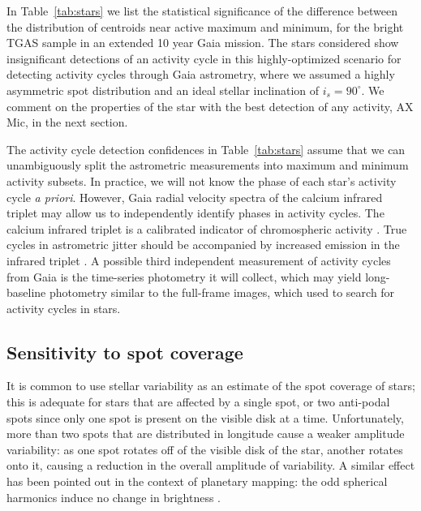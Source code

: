 In Table~\ref{tab:stars} we list the statistical significance of the difference between the distribution of centroids near active maximum and minimum, for the bright TGAS sample in an extended 10 year Gaia mission. The stars considered show insignificant detections of an activity cycle in this highly-optimized scenario for detecting activity cycles through Gaia astrometry, where we assumed a highly asymmetric spot distribution and an ideal stellar inclination of $i_s = 90^\circ$. We comment on the properties of the star with the best detection of any activity, AX Mic, in the next section.

The activity cycle detection confidences in Table~\ref{tab:stars} assume that we can unambiguously split the astrometric measurements into maximum and minimum activity subsets. In practice, we will not know the phase of each star's activity cycle \textit{a priori}. However, Gaia radial velocity spectra of the calcium infrared triplet may allow us to independently identify phases in activity cycles. The calcium infrared triplet is a calibrated indicator of chromospheric activity \citep[see e.g.:][]{Chmielewski2000, Cenarro2001, Cauzzi2008, Zerjal2013, BoroSaikia2016, Robertson2016, Martin2017}. True cycles in astrometric jitter should be accompanied by increased emission in the infrared triplet \citep{Andretta2005, Busa2007}. A possible third independent measurement of activity cycles from Gaia is the time-series photometry it will collect, which may yield long-baseline photometry similar to the \kepler full-frame images, which \citet{Montet2017} used to search for activity cycles in \kepler stars.

\subsection{Sensitivity to spot coverage}

It is common to use stellar variability as an estimate of the spot coverage
of stars;  this is adequate for stars that are affected by a single spot,
or two anti-podal spots since only one spot is present on the visible disk
at a time.  Unfortunately, more than two spots that are distributed 
in longitude
cause a weaker amplitude variability:  as one spot rotates off of the
visible disk of the star, another rotates onto it, causing a reduction in
the overall amplitude of variability.  A similar effect has been pointed
out in the context of planetary mapping:  the odd spherical harmonics
induce no change in brightness \citep{Cowan2008}.

